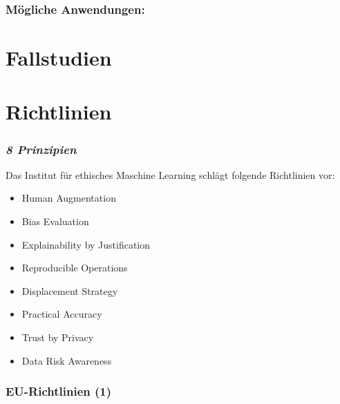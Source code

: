 \documentclass[aspectratio=169,xcolor=dvipsnames]{beamer}
\begin{document}

\begin{frame}
\frametitle{Mögliche Anwendungen:}
\end{frame}

\section{Fallstudien}

\begin{frame}
\frametitle{}
\end{frame}

\begin{frame}
\frametitle{}
\end{frame}

\begin{frame}
\frametitle{}
\end{frame}

\begin{frame}
\frametitle{}
\end{frame}

\section{Richtlinien}

\begin{frame}[fragile]
\frametitle{\emph{8 Prinzipien}}
\begin{center}
Das Institut für ethisches Maschine Learning schlägt folgende Richtlinien vor:
\end{center}
\medskip

\large
\setlength{\leftmargini}{150pt}
\begin{itemize}[label=\textcolor{RedOrange}{\textbullet}]
\item Human Augmentation
\item Bias Evaluation
\item Explainability by Justification 
\item Reproducible Operations
\item Displacement Strategy
\item Practical Accuracy
\item Trust by Privacy
\item Data Risk Awareness
\end{itemize}
\end{frame}

\begin{frame}
\frametitle{\emojieu EU-Richtlinien (1)}
\end{frame}
\end{document}
